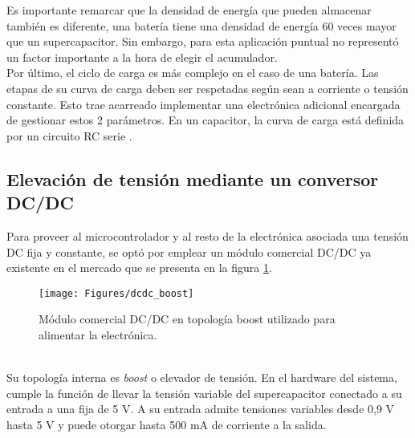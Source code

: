 Es importante remarcar que la densidad de energía que pueden almacenar también es diferente, una batería tiene una densidad de energía 60 veces mayor que un supercapacitor. Sin embargo, para esta aplicación puntual no representó un factor importante a la hora de elegir el acumulador.\\
Por último, el ciclo de carga es más complejo en el caso de una batería. Las etapas de su curva de carga deben ser respetadas según sean a corriente o tensión constante. Esto trae acarreado implementar una electrónica adicional encargada de gestionar estos 2 parámetros. En un capacitor, la curva de carga está definida por un circuito RC serie \citep{ceraolo2014fundamentals}.\\ 

\subsection{Elevación de tensión mediante un conversor DC/DC }
Para proveer al microcontrolador y al resto de la electrónica asociada una tensión DC fija y constante, se optó por emplear un módulo comercial DC/DC ya existente en el mercado que se presenta en la figura \ref{fig:dcdcboost}.\\
\begin{figure}[h!]
	\centering
	\texttt{[image: Figures/dcdc\_boost]}
	\caption{Módulo comercial DC/DC en topología boost utilizado para alimentar la electrónica.}
	\label{fig:dcdcboost}
\end{figure}\\
Su topología interna es \textit{boost} o elevador de tensión. En el hardware del sistema, cumple la función de llevar la tensión variable del supercapacitor conectado a su entrada a una fija de 5 V. 
A su entrada admite tensiones variables desde 0,9 V hasta 5 V y puede otorgar hasta 500 mA de corriente a la salida.

